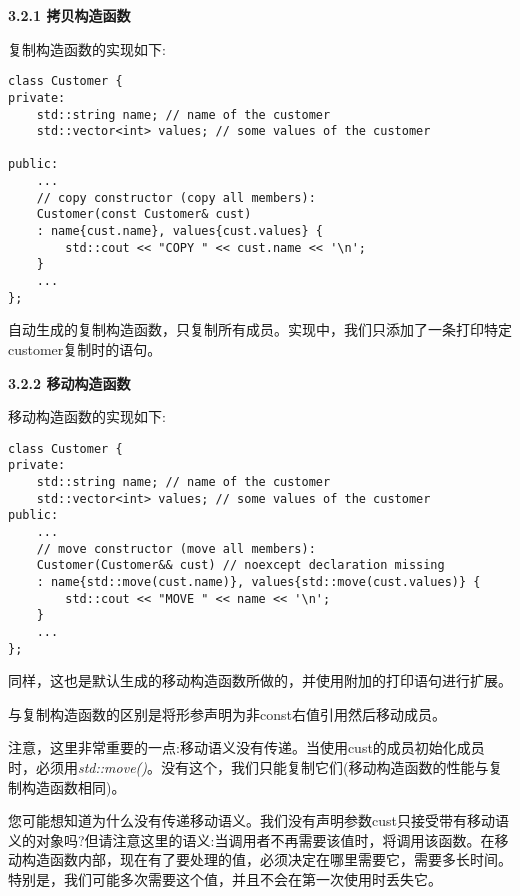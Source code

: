 \hspace*{\fill} \par %
\textbf{3.2.1 拷贝构造函数}

复制构造函数的实现如下:\par

\begin{lstlisting}[caption={}]
class Customer {
private:
	std::string name; // name of the customer
	std::vector<int> values; // some values of the customer
	
public:
	...
	// copy constructor (copy all members):
	Customer(const Customer& cust)
	: name{cust.name}, values{cust.values} {
		std::cout << "COPY " << cust.name << '\n';
	}
	...
};
\end{lstlisting}

自动生成的复制构造函数，只复制所有成员。实现中，我们只添加了一条打印特定customer复制时的语句。\par

\hspace*{\fill} \par %
\textbf{3.2.2 移动构造函数}

移动构造函数的实现如下:\par

\begin{lstlisting}[caption={}]
class Customer {
private:
	std::string name; // name of the customer
	std::vector<int> values; // some values of the customer
public:
	...
	// move constructor (move all members):
	Customer(Customer&& cust) // noexcept declaration missing
	: name{std::move(cust.name)}, values{std::move(cust.values)} {
		std::cout << "MOVE " << name << '\n';
	}
	...
};
\end{lstlisting}

同样，这也是默认生成的移动构造函数所做的，并使用附加的打印语句进行扩展。\par

与复制构造函数的区别是将形参声明为非const右值引用然后移动成员。\par

注意，这里非常重要的一点:移动语义没有传递。当使用cust的成员初始化成员时，必须用\textit{std::move()}。没有这个，我们只能复制它们(移动构造函数的性能与复制构造函数相同)。\par

您可能想知道为什么没有传递移动语义。我们没有声明参数cust只接受带有移动语义的对象吗?但请注意这里的语义:当调用者不再需要该值时，将调用该函数。在移动构造函数内部，现在有了要处理的值，必须决定在哪里需要它，需要多长时间。特别是，我们可能多次需要这个值，并且不会在第一次使用时丢失它。\par

